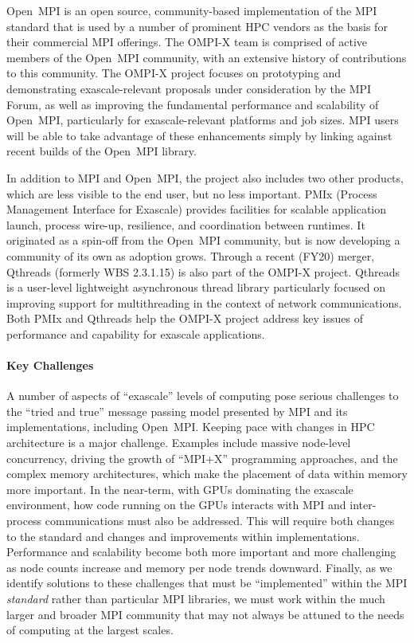 Open~MPI is an open source, community-based implementation of the MPI
standard that is used by a number of prominent
HPC vendors as the basis for their commercial MPI offerings.   The
OMPI-X team is comprised of active members of the Open~MPI community,
with an extensive history of contributions to this community.
The OMPI-X project focuses on prototyping
and demonstrating exascale-relevant proposals under consideration by
the MPI Forum, as well as improving the fundamental performance and
scalability of Open~MPI, particularly for exascale-relevant platforms
and job sizes.
MPI users will be able to take advantage of these
enhancements simply by linking against recent builds of the Open~MPI
library.

In addition to MPI and Open~MPI, the project also includes two other products,
which are less visible to the end user, but no less important.
PMIx (Process Management Interface for Exascale) provides facilities for
scalable application launch, process wire-up, resilience, and coordination between runtimes.
It originated as a spin-off from the Open~MPI community, but is now developing a
community of its own as adoption grows.  Through a recent (FY20) merger,
Qthreads (formerly WBS 2.3.1.15) is also part of the OMPI-X project.  Qthreads is a
user-level lightweight asynchronous thread library particularly focused on improving support for
multithreading in the context of network communications.  Both PMIx and Qthreads help the
OMPI-X project address key issues of performance and capability for exascale applications.


\paragraph{Key  Challenges}
A number of aspects of ``exascale'' levels
of computing pose serious challenges to the ``tried and true'' message
passing model presented by MPI and its implementations, including Open~MPI.
%
Keeping pace with changes in HPC architecture is a major challenge.
Examples include massive node-level concurrency, driving the
growth of ``MPI+X'' programming approaches,
and the complex memory architectures, which make the placement of data
within memory more important. In the near-term, with GPUs dominating the exascale
environment, how code running on the GPUs interacts with MPI and inter-process
communications must also be addressed.  This will require both changes to the standard
and changes and improvements within implementations.
%
Performance and scalability become both more important and more
challenging as node counts increase
and memory per node trends downward.
%
Finally, as we identify solutions to these challenges that must be
``implemented'' within the MPI \emph{standard} rather than particular MPI libraries,
we must work within the much larger and broader MPI
community that may not always be attuned to the needs of computing at the largest scales.

